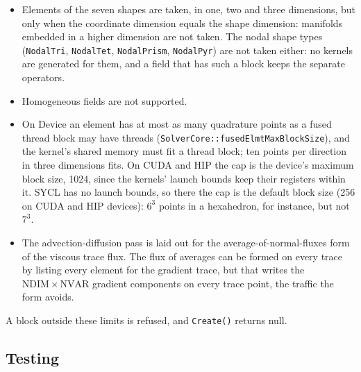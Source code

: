 \begin{itemize}
  \item Elements of the seven shapes are taken, in one, two and three
    dimensions, but only when the coordinate dimension equals the shape
    dimension: manifolds embedded in a higher dimension are not taken.
    The nodal shape types (\texttt{NodalTri}, \texttt{NodalTet},
    \texttt{NodalPrism}, \texttt{NodalPyr}) are not taken either: no
    kernels are generated for them, and a field that has such a block
    keeps the separate operators.
  \item Homogeneous fields are not supported.
  \item On Device an element has at most as many quadrature points as a
    fused thread block may have threads
    (\texttt{SolverCore::fusedElmtMaxBlockSize}), and the kernel's shared
    memory must fit a thread block; ten points per direction in three
    dimensions fits. On CUDA and HIP the cap is the device's maximum block
    size, 1024, since the kernels' launch bounds keep their registers
    within it. SYCL has no launch bounds, so there the cap is the default
    block size (256 on CUDA and HIP devices): $6^3$ points in a hexahedron,
    for instance, but not $7^3$.
  \item The advection-diffusion pass is laid out for the
    average-of-normal-fluxes form of the viscous trace flux. The flux of
    averages can be formed on every trace by listing every element for the
    gradient trace, but that writes the $\mathrm{NDIM} \times \mathrm{NVAR}$
    gradient components on every trace point, the traffic the form avoids.
\end{itemize}
A block outside these limits is refused, and \texttt{Create()} returns null.

\subsection{Testing}

